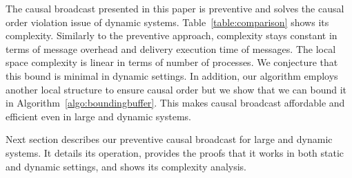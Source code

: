 The causal broadcast presented in this paper is preventive and solves the causal
order violation issue of dynamic systems.  Table~\ref{table:comparison} shows
its complexity. Similarly to the preventive approach, complexity stays constant
in terms of message overhead and delivery execution time of messages. The local
space complexity is linear in terms of number of processes. We conjecture that
this bound is minimal in dynamic settings. In addition, our algorithm employs
another local structure to ensure causal order but we show that we can bound it
in Algorithm~\ref{algo:boundingbuffer}. This makes causal broadcast affordable
and efficient even in large and dynamic systems.

Next section describes our preventive causal broadcast for large and dynamic
systems. It details its operation, provides the proofs that it works in both
static and dynamic settings, and shows its complexity analysis.



